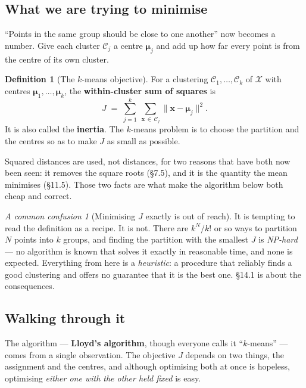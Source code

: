 \documentclass[11pt]{article}
\theoremstyle{plain}
\theoremstyle{definition}
\newtheorem{defn}{Definition}[section]
\theoremstyle{remark}
\newtheorem*{warn}{A common confusion}
\newcommand{\vc}[1]{\mathbf{#1}}
\newcommand{\norm}[1]{\lVert #1\rVert}
\newcommand{\X}{\mathcal{X}}
\newcommand{\Cl}{\mathcal{C}}
\newcommand{\bmu}{\boldsymbol{\mu}}
\begin{document}
\subsection{What we are trying to minimise}
``Points in the same group should be close to one another'' now becomes a
number. Give each cluster $\Cl_j$ a centre $\bmu_j$ and add up how far every
point is from the centre of its own cluster.

\begin{defn}[The $k$-means objective]
For a clustering $\Cl_1,\dots,\Cl_k$ of $\X$ with centres
$\bmu_1,\dots,\bmu_k$, the \textbf{within-cluster sum of squares} is
\[
  J \;=\; \sum_{j=1}^{k}\ \sum_{\vc{x}\,\in\,\Cl_j}
          \norm{\vc{x}-\bmu_j}^{2} .
\]
It is also called the \textbf{inertia}. The $k$-means problem is to choose the
partition and the centres so as to make $J$ as small as possible.
\end{defn}

\noindent Squared distances are used, not distances, for two reasons that have
both now been seen: it removes the square roots (\S7.5), and it is the quantity
the mean minimises (\S11.5). Those two facts are what make the algorithm below
both cheap and correct.

\begin{warn}[Minimising $J$ exactly is out of reach]
It is tempting to read the definition as a recipe. It is not. There are
$k^{N}/k!$ or so ways to partition $N$ points into $k$ groups, and finding the
partition with the smallest $J$ is \emph{NP-hard} --- no algorithm is known that
solves it exactly in reasonable time, and none is expected. Everything from here
is a \emph{heuristic}: a procedure that reliably finds a good clustering and
offers no guarantee that it is the best one. \S14.1 is about the consequences.
\end{warn}

\subsection{Walking through it}
The algorithm --- \textbf{Lloyd's algorithm}, though everyone calls it
``$k$-means'' --- comes from a single observation. The objective $J$ depends on
two things, the assignment and the centres, and although optimising both at once
is hopeless, optimising \emph{either one with the other held fixed} is easy.
\end{document}
